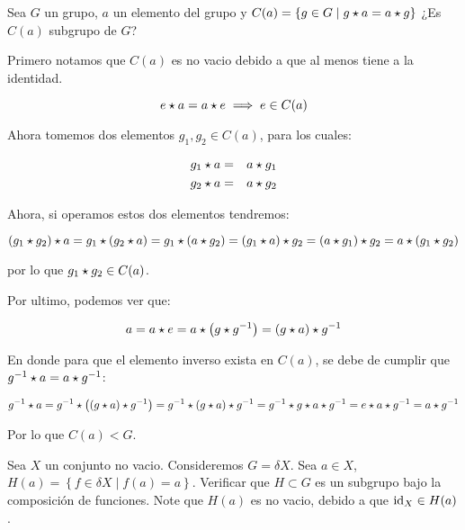         \begin{ejemplo}
            Sea $G$ un grupo, $a$ un elemento del grupo y $C(a) = \left\{ g \in G \mid g \star a = a \star g \right\}$ ¿Es $C(a)$ subgrupo de $G$?

            Primero notamos que $C(a)$ es no vacio debido a que al menos tiene a la identidad.

            \begin{equation*}
                e \star a = a \star e \implies e \in C(a)
            \end{equation*}

            Ahora tomemos dos elementos $g_1, g_2 \in C(a)$, para los cuales:

            \begin{eqnarray*}
                g_1 \star a & = & a \star g_1 \\
                g_2 \star a & = & a \star g_2
            \end{eqnarray*}

            Ahora, si operamos estos dos elementos tendremos:

            \begin{equation*}
                (g_1 \star g_2) \star a = g_1 \star (g_2 \star a) = g_1 \star (a \star g_2) = (g_1 \star a) \star g_2 = (a \star g_1) \star g_2 = a \star (g_1 \star g_2)
            \end{equation*}

            por lo que $g_1 \star g_2 \in C(a)$.

            Por ultimo, podemos ver que:

            \begin{equation*}
                a = a \star e = a \star \left( g \star g^{-1} \right) = (g \star a) \star g^{-1}
            \end{equation*}

            En donde para que el elemento inverso exista en $C(a)$, se debe de cumplir que $g^{-1} \star a = a \star g^{-1}$:

            \begin{equation*}
                g^{-1} \star a = g^{-1} \star \left( (g \star a) \star g^{-1} \right) = g^{-1} \star (g \star a) \star g^{-1} = g^{-1} \star g \star a \star g^{-1} = e \star a \star g^{-1} = a \star g^{-1}
            \end{equation*}

            Por lo que $C(a) < G$.
        \end{ejemplo}

        \begin{ejercicio}
            Sea $X$ un conjunto no vacio. Consideremos $G = \delta X$. Sea $a \in X$, $H(a) = \left\{ f \in \delta X \mid f(a) = a \right\}$. Verificar que $H \subset G$ es un subgrupo bajo la composición de funciones. Note que $H(a)$ es no vacio, debido a que $\operatorname{id}_X \in H(a)$.
        \end{ejercicio}


